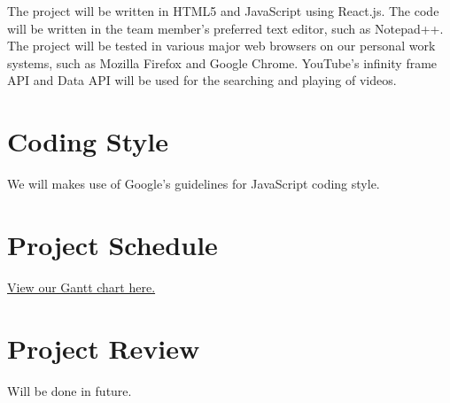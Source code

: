 \documentclass{article}
\begin{document}
The project will be written in HTML5 and JavaScript using React.js. The code will be written in the team member's preferred text editor, such as Notepad++. The project will be tested in various major web browsers on our personal work systems, such as Mozilla Firefox and Google Chrome. YouTube's infinity frame API and Data API will be used for the searching and playing of videos.

\section{Coding Style}

We will makes use of Google’s guidelines for JavaScript coding style.

\section{Project Schedule}

\href{https://gitlab.cas.mcmaster.ca/delalik/Shuffle/blob/master/ProjectSchedule/Shuffle.gan}{View our Gantt chart here.}

\section{Project Review}

Will be done in future.
\end{document}
